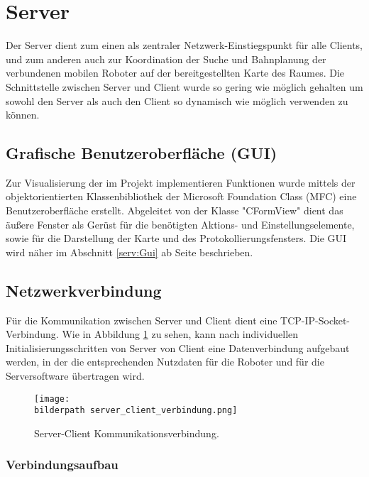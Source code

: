 \def\bilderpath{bilder/}

\section{Server}\label{serv:Server}

Der Server dient zum einen als zentraler Netzwerk-Einstiegspunkt für alle
Clients, und zum anderen auch zur Koordination der Suche und Bahnplanung der verbundenen mobilen Roboter auf der bereitgestellten Karte des Raumes. Die Schnittstelle zwischen Server und Client wurde so gering wie möglich gehalten um sowohl den Server als auch den Client so dynamisch wie möglich verwenden zu können.

\subsection{Grafische Benutzeroberfläche (GUI)}\label{serv:archGui}
Zur Visualisierung der im Projekt implementieren Funktionen wurde
mittels der objektorientierten Klassenbibliothek der Microsoft
Foundation Class (MFC) eine Benutzeroberfläche erstellt. Abgeleitet
von der Klasse "CFormView" dient das äußere Fenster als Gerüst für die
benötigten Aktions- und Einstellungselemente, sowie für die
Darstellung der Karte und des Protokollierungsfensters.  Die GUI wird
näher im Abschnitt \ref{serv:Gui} ab Seite \pageref{serv:Gui} beschrieben.
\subsection{Netzwerkverbindung}\label{serv:netzwerkverbindung}
Für die Kommunikation zwischen Server und Client dient eine TCP-IP-Socket-Verbindung. Wie in Abbildung \ref{serv:fig:netzwerkverbindung} zu sehen, kann nach individuellen Initialisierungsschritten von Server von Client eine Datenverbindung aufgebaut werden, in der die entsprechenden Nutzdaten für die Roboter und für die Serversoftware übertragen wird.

\begin{figure}[h]
	\centering	
	\texttt{[image: \\bilderpath server\_client\_verbindung.png]}
	\caption{Server-Client Kommunikationsverbindung.}
	\label{serv:fig:netzwerkverbindung}
\end{figure}

\subsubsection{Verbindungsaufbau}

